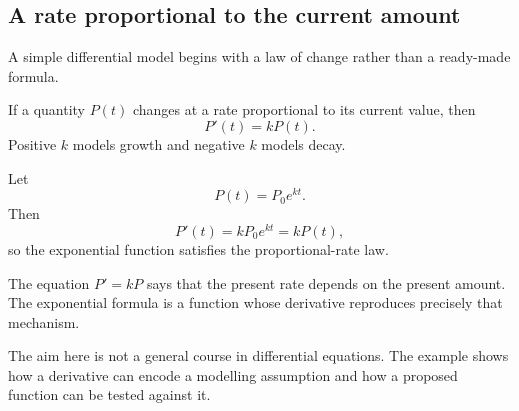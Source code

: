 \subsection{A rate proportional to the current amount}

A simple differential model begins with a law of change rather than a ready-made formula.

\begin{corebox}
If a quantity $P(t)$ changes at a rate proportional to its current value, then
\[
P'(t)=kP(t).
\]
Positive $k$ models growth and negative $k$ models decay.
\end{corebox}

\begin{examplebox}
Let
\[
P(t)=P_0e^{kt}.
\]
Then
\[
P'(t)=kP_0e^{kt}=kP(t),
\]
so the exponential function satisfies the proportional-rate law.
\end{examplebox}

\begin{interpretationbox}
The equation $P'=kP$ says that the present rate depends on the present amount. The exponential formula is a function whose derivative reproduces precisely that mechanism.
\end{interpretationbox}

The aim here is not a general course in differential equations. The example shows how a derivative can encode a modelling assumption and how a proposed function can be tested against it.
